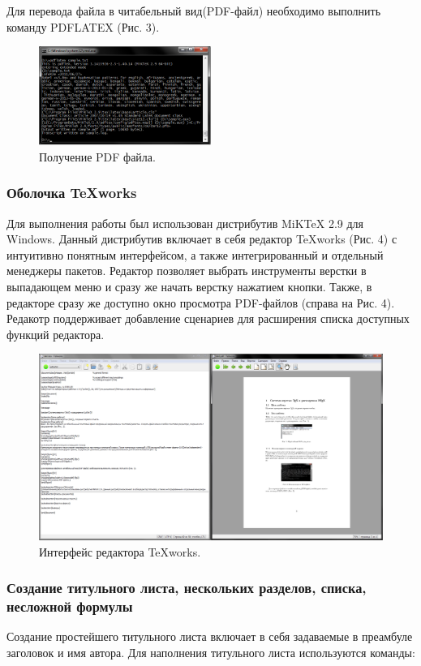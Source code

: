 \documentclass[a4paper, 14pt]{article}				%
\begin{document}
Для перевода файла в читабельный вид(PDF-файл) необходимо выполнить команду PDFLATEX (Рис. 3).

\begin{figure}[h!]
\centering
\includegraphics[width=0.5\textwidth]{fig3}
\caption{Получение PDF файла.}
\end{figure}

\subsubsection{Оболочка TeXworks}
Для выполнения работы был использован дистрибутив MiKTeX 2.9 для Windows. Данный дистрибутив включает в себя редактор TeXworks (Рис. 4) с интуитивно понятным интерфейсом, а также интегрированный и отдельный менеджеры пакетов. Редактор позволяет выбрать инструменты верстки в выпадающем меню и сразу же начать верстку нажатием кнопки. Также, в редакторе сразу же доступно окно просмотра PDF-файлов (справа на Рис. 4). Редакотр поддерживает добавление сценариев для расширения списка доступных функций редактора. 
\begin{figure}[h!]
\centering
\includegraphics[width=\textwidth]{fig4}
\caption{Интерфейс редактора TeXworks.}
\end{figure}

\subsubsection{Создание титульного листа, нескольких разделов, списка, несложной формулы}
Создание простейшего титульного листа включает в себя задаваемые в преамбуле заголовок и имя автора. Для наполнения титульного листа используются команды:
\end{document}
